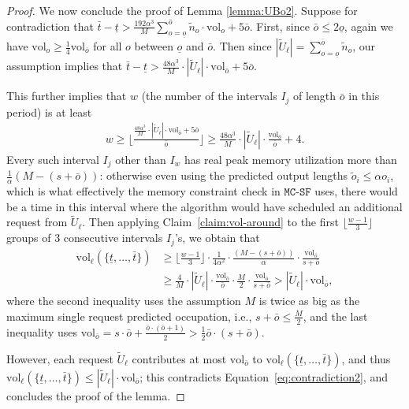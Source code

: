 \documentclass[11pt, a4paper]{article}
\theoremstyle{plain}
\theoremstyle{definition}
\theoremstyle{remark}
\newcommand{\mcsdf}{\texttt{MC-SF}}
\newcommand{\vol}{\textrm{vol}}
\newcommand{\alg}{\mcsdf}
\newcommand{\po}{\tilde{o}}
\begin{document}
\begin{proof}
	We now conclude the proof of Lemma \ref{lemma:UBo2}.	Suppose for contradiction that $\bar{t} - \underline{t} > \frac{192\alpha^3}{M} \sum_{o = \underline{o}}^{\bar{o}} \tilde{n}_o \cdot \vol_o + 5\bar{o}$. First, since $\bar{o} \le 2 \underline{o}$, again we have  $\vol_o \ge \frac{1}{4} \vol_{\overline{o}}$ for all $o$ between $\underline{o}$ and $\bar{o}$. Then since $|\tilde{U}_\ell| = \sum_{o = \underline{o}}^{\bar{o}} \tilde{n}_o$, our assumption implies that $\bar{t} - \underline{t} > \frac{48\alpha^3}{M} \cdot |\tilde{U}_\ell| \cdot \vol_{\bar{o}} + 5\bar{o}$. 
	
	This further implies that $w$ (the number of the intervals $I_j$ of length $\bar{o}$ in this period) is at least 
	\begin{align*}
	w \ge \bigg\lfloor \frac{\frac{48\alpha^3}{M} \cdot |\tilde{U}_\ell| \cdot \vol_{\bar{o}} + 5\bar{o}}{\bar{o}}  \bigg\rfloor \ge \frac{48\alpha^3}{M} \cdot |\tilde{U}_\ell| \cdot \frac{\vol_{\bar{o}}}{\bar{o}} + 4.
	\end{align*}
	Every such interval $I_j$ other than $I_w$ has real peak memory utilization 
    more than $\frac{1}{\alpha} (M - (s+\bar{o}))$: otherwise even using the predicted output lengths $\po_i \le \alpha o_i$, which is what effectively the memory constraint check in $\alg$ uses, there would be a time in this interval where the algorithm would have scheduled an additional request from $\tilde{U}_\ell$.
    Then applying Claim~\ref{claim:vol-around} to the first $\lfloor \frac{w-1}{3} \rfloor$ groups of 3 consecutive intervals $I_j$'s, we obtain that 
	\begin{align}
	\vol_\ell(\{\underline{t},\ldots,\bar{t}\}) &\ge \bigg\lfloor \frac{w-1}{3} \bigg\rfloor \cdot \frac{1}{4\alpha^2} \cdot \frac{(M - (s+\bar{o}))}{\alpha} \cdot \frac{\vol_{\bar{o}}}{s+\bar{o}} \nonumber \\
	& \ge \frac{4}{M} \cdot |\tilde{U}_\ell| \cdot \frac{\vol_{\bar{o}}}{\bar{o}} \cdot \frac{M}{2} \cdot \frac{\vol_{\bar{o}}}{s+\bar{o}} > |\tilde{U}_\ell| \cdot \vol_{\bar{o}}, \label{eq:contradiction2}
	\end{align}
	where the second inequality uses the assumption $M$ is twice as big as the maximum single request predicted occupation, i.e., $s + \bar{o} \le \frac{M}{2}$, and the last inequality uses $\vol_{\bar{o}} = s \cdot \bar{o} + \frac{\bar{o} \cdot (\bar{o}+1)}{2} > \frac{1}{2} \bar{o} \cdot (s + \bar{o})$. 
	
	However, each request $\tilde{U}_\ell$ contributes at most $\vol_{\bar{o}}$ to $\vol_\ell(\{\underline{t},\ldots,\bar{t}\})$, and thus $\vol_\ell(\{\underline{t},\ldots,\bar{t}\}) \le |\tilde{U}_\ell| \cdot \vol_{\bar{o}}$; this contradicts Equation~\eqref{eq:contradiction2}, and concludes the proof of the lemma. 	
\end{proof}
\end{document}

